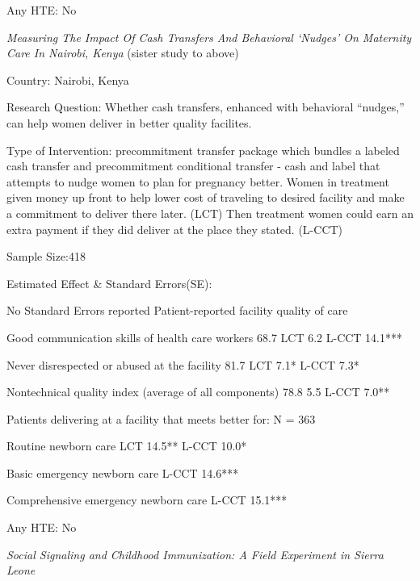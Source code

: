\documentclass{article}
\begin{document}
\hfill

Any HTE: No

\hfill

\break

\textit{Measuring The Impact Of Cash Transfers And Behavioral ‘Nudges’ On Maternity Care In Nairobi, Kenya}
(sister study to above)

\hfill

Country: Nairobi, Kenya

\hfill

Research Question:
Whether cash transfers, enhanced with behavioral “nudges,” can help women deliver in better quality facilites.

\hfill

Type of Intervention: precommitment transfer package which bundles a labeled cash transfer and  precommitment conditional transfer - cash and label that attempts to nudge women to plan for pregnancy better. 
Women in treatment given money up front to help lower cost of traveling to desired facility and make a commitment to deliver there later. (LCT)
Then treatment women could earn an extra payment if they did deliver at the place they stated. (L-CCT)

\hfill

Sample Size:418

\hfill

Estimated Effect \& Standard Errors(SE): 

\hfill

No Standard Errors reported
Patient-reported facility quality of care 

Good communication skills of health care workers 68.7 LCT 6.2 L-CCT 14.1*** 
 
Never disrespected or abused at the facility 81.7 LCT 7.1* L-CCT 7.3*

Nontechnical quality index (average of all components) 78.8 5.5 L-CCT 7.0**
 
Patients delivering at a facility that meets better for: N = 363

Routine newborn care LCT 14.5**  L-CCT 10.0*

Basic emergency newborn care L-CCT 14.6*** 

Comprehensive emergency newborn care L-CCT 15.1*** 

\hfill

Any HTE: No


\hfill

\textit{Social Signaling and Childhood Immunization: A Field Experiment in Sierra Leone}
\end{document}
